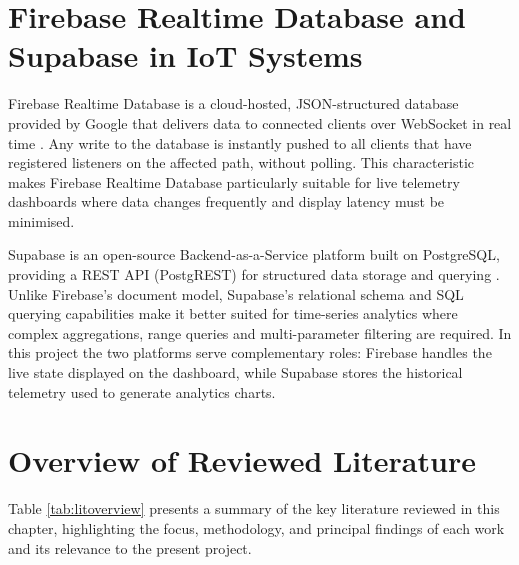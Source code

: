 \documentclass[12pt, a4paper]{report}
\begin{document}
\section{Firebase Realtime Database and Supabase in IoT Systems}

Firebase Realtime Database is a cloud-hosted, JSON-structured database
provided by Google that delivers data to connected clients over WebSocket
in real time \citep{expodocs2024}. Any write to the database is instantly
pushed to all clients that have registered listeners on the affected path,
without polling. This characteristic makes Firebase Realtime Database
particularly suitable for live telemetry dashboards where data changes
frequently and display latency must be minimised.

Supabase is an open-source Backend-as-a-Service platform built on
PostgreSQL, providing a REST API (PostgREST) for structured data storage
and querying \citep{firebasedocs2024}. Unlike Firebase's document model,
Supabase's relational schema and SQL querying capabilities make it better
suited for time-series analytics where complex aggregations, range queries
and multi-parameter filtering are required. In this project the two
platforms serve complementary roles: Firebase handles the live state
displayed on the dashboard, while Supabase stores the historical telemetry
used to generate analytics charts.

\section{Overview of Reviewed Literature}

Table \ref{tab:litoverview} presents a summary of the key literature reviewed in this chapter, highlighting the focus, methodology, and principal findings of each work and its relevance to the present project.
\end{document}

